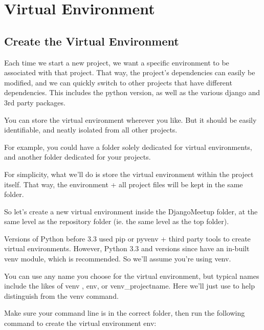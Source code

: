 \documentclass[letterpaper,10pt,english]{sphinxmanual}
\begin{document}
\begin{sphinxVerbatim}[commandchars=\\\{\}]
   
\end{sphinxVerbatim}


\section{Virtual Environment}
\label{\detokenize{guide/03_virtualenv:virtual-environment}}\label{\detokenize{guide/03_virtualenv::doc}}

\subsection{Create the Virtual Environment}
\label{\detokenize{guide/03_virtualenv:create-the-virtual-environment}}
Each time we start a new project, we want a specific environment to be associated with that project. That way, the project’s dependencies can easily be modified, and we can quickly switch to other projects that have different dependencies.  This includes the python version, as well as the various django and 3rd party packages.

You can store the virtual environment wherever you like.  But it should be easily identifiable, and neatly isolated from all other projects.

For example, you could have a folder solely dedicated for virtual environments, and another folder dedicated for your projects.

For simplicity, what we’ll do is store the virtual environment within the project itself. That way, the environment + all project files will be kept in the same folder.

So let’s create a new virtual environment inside the DjangoMeetup folder, at the same level as the repository folder (ie. the same level as the top  folder).

Versions of Python before 3.3 used pip or pyvenv + third party tools to create virtual environments.  However, Python 3.3 and versions since have an in-built venv module, which is recommended.  So we’ll assume you’re using venv.

You can use any name you choose for the virtual environment, but typical names include the likes of venv , env, or venv\_projectname.  Here we’ll just use  to help distinguish from the venv command.

Make sure your command line is in the correct folder, then run the following command to create the virtual environment env:
\end{document}
